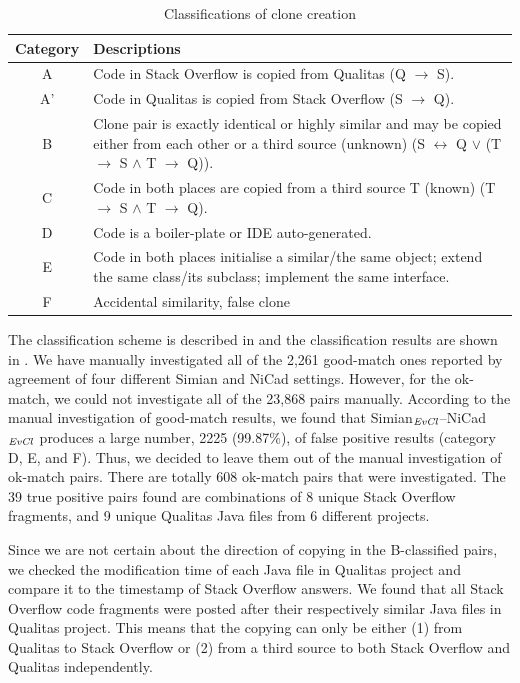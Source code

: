 \documentclass{sig-alternate-05-2015}
\begin{document}
\begin{table}
	\centering
	\caption{Classifications of clone creation}
	\label{tab:classification_scheme}
	\begin{tabular}{|c|p{13cm}|}
		\hline 
		Category & Descriptions \\ 
		\hline 
		A & Code in Stack Overflow is copied from Qualitas (Q $\rightarrow$ S). \\ 
		\hline 
		A' & Code in Qualitas is copied from Stack Overflow (S $\rightarrow$ Q). \\ 
		\hline 
		B & Clone pair is exactly identical or highly similar and may be copied either from each other or a third source (unknown) (S $\leftrightarrow$ Q $\vee$ (T $\rightarrow$ S $\wedge$ T $\rightarrow$ Q)).
		\\ 
		\hline 
		C & Code in both places are copied from a third source T (known) (T $\rightarrow$ S $\wedge$ T $\rightarrow$ Q).
		\\ 
		\hline 
		D & Code is a boiler-plate or IDE auto-generated.
		\\ 
		\hline 
		E & Code in both places initialise a similar/the same object; extend the same class/its subclass; implement the same interface.
		\\ 
		\hline 
		F & Accidental similarity, false clone \\ 
		\hline 
	\end{tabular} 
\end{table}

The classification scheme is described in  and the classification results are shown in . We have manually investigated all of the 2,261 good-match ones reported by agreement of four different Simian and NiCad settings.  However, for the ok-match, we could not investigate all of the 23,868 pairs manually.  According to the manual investigation of good-match results, we found that Simian$_{\textrm{\textit{EvCl}}}$--NiCad$_{\textrm{\textit{EvCl}}}$ produces a large number, 2225 (99.87\%), of false positive results (category D, E, and F). Thus, we decided to leave them out of the manual investigation of ok-match pairs. There are totally 608 ok-match pairs that were investigated. The 39 true positive pairs found are combinations of 8 unique Stack Overflow fragments, and 9 unique Qualitas Java files from 6 different projects.

Since we are not certain about the direction of copying in the B-classified pairs, we checked the modification time of each Java file in Qualitas project and compare it to the timestamp of Stack Overflow answers. We found that all Stack Overflow code fragments were posted after their respectively similar Java files in Qualitas project. This means that the copying can only be either (1) from Qualitas to Stack Overflow or (2) from a third source to both Stack Overflow and Qualitas independently.
\end{document}
